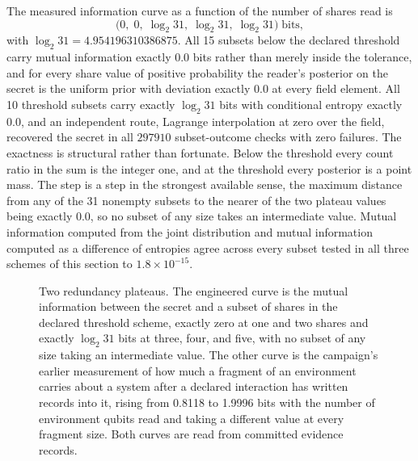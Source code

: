 \documentclass[aps,pre,reprint,nofootinbib]{revtex4-2}
\begin{document}
The measured information curve as a function of the number of shares
read is
\begin{equation}
  \bigl(0,\; 0,\; \log_2 31,\; \log_2 31,\; \log_2 31\bigr)
  \;\text{bits},
  \label{eq:step}
\end{equation}
with $\log_2 31 = 4.954196310386875$.  All 15 subsets below the
declared threshold carry mutual information exactly $0.0$ bits rather
than merely inside the tolerance, and for every share value of
positive probability the reader's posterior on the secret is the
uniform prior with deviation exactly $0.0$ at every field element.
All 10 threshold subsets carry exactly $\log_2 31$ bits with
conditional entropy exactly $0.0$, and an independent route, Lagrange
interpolation at zero over the field, recovered the secret in all
$297910$ subset-outcome checks with zero failures.  The exactness is
structural rather than fortunate.  Below the threshold every count
ratio in the sum is the integer one, and at the threshold every
posterior is a point mass.  The step is a step in the strongest
available sense, the maximum distance from any of the 31 nonempty
subsets to the nearer of the two plateau values being exactly $0.0$,
so no subset of any size takes an intermediate value.  Mutual
information computed from the joint distribution and mutual
information computed as a difference of entropies agree across every
subset tested in all three schemes of this section to
$1.8 \times 10^{-15}$.

\begin{figure}[t]
\centering
{}
\caption{Two redundancy plateaus.  The engineered curve is the mutual
information between the secret and a subset of shares in the declared
threshold scheme, exactly zero at one and two shares and exactly
$\log_2 31$ bits at three, four, and five, with no subset of any size
taking an intermediate value.  The other curve is the campaign's
earlier measurement of how much a fragment of an environment carries
about a system after a declared interaction has written records into
it, rising from 0.8118 to 1.9996 bits with the number of environment
qubits read and taking a different value at every fragment size.  Both
curves are read from committed evidence records.}
\label{fig:cr0}
\end{figure}
\end{document}
